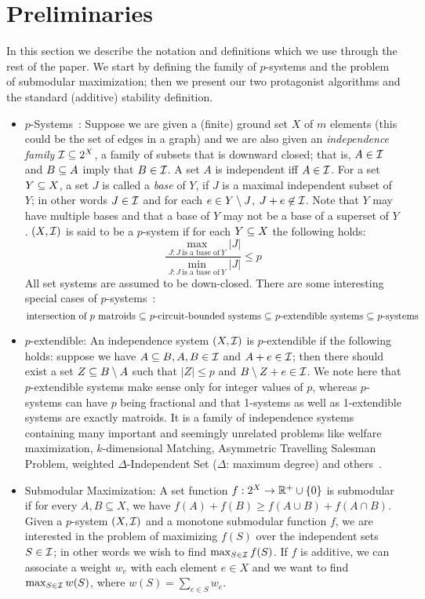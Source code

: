\section{Preliminaries}\label{sec:preliminaries}
In this section we describe the notation and definitions which we use through the rest of the paper. We start by defining the family of $p$-systems and the problem of submodular maximization; then we present our two protagonist algorithms and the standard (additive) stability definition.

\begin{itemize}
\item
$p$-Systems~\cite{korte1978analysis,lee2009submodular}: Suppose we are given a (finite) ground set $X$ of $m$ elements (this could be the set of edges in a graph) and we are also given an \textit{independence family} $\mathcal{I}\subseteq 2^X$, a family of subsets that is downward closed; that is, $A \in \mathcal{I}$ and $B\subseteq A$ imply that $B\in \mathcal{I}$. A set $A$ is independent iff $A\in \mathcal{I}$. For a set $Y\subseteq X$, a set $J$ is called a \textit{base} of $Y$, if $J$  is a maximal independent subset of $Y$; in other words $J\in \mathcal{I}$ and for each $e\in Y\setminus J$, $J+e\not\in \mathcal{I}$. Note that $Y$ may have multiple bases and that a base of $Y$ may not be a base of a superset of $Y$. $(X,\mathcal{I})$ is said to be a $p$-system if for each $Y\subseteq X$ the following holds:
\[ \dfrac{\max_{J: J\ \text{is a base of}\ Y} |J|}{\min_{J: J\ \text{is a base of}\ Y}|J|} \le p\]
 All set systems are assumed to be down-closed. There are some interesting special cases of $p$-systems~\cite{mestre2006greedy, calinescu2011maximizing}: 
\[
\text{intersection of $p$ matroids $\subseteq$ $p$-circuit-bounded systems $\subseteq$ $p$-extendible systems $\subseteq$ $p$-systems} 
\]
\item $p$-extendible: An independence system $(X,\mathcal{I})$ is $p$-extendible if the following holds: suppose we have $A\subseteq B, A,B \in \mathcal{I}$ and $A+e\in \mathcal{I}$; then there should exist a set $Z\subseteq B\setminus A$ such that $|Z|\le p$ and $B\setminus Z +e \in \mathcal{I}$. We note here that $p$-extendible systems make sense only for integer values of $p$, whereas $p$-systems can have $p$ being fractional and that 1-systems as well as 1-extendible systems are exactly matroids. It is a family of independence systems containing many important and seemingly unrelated problems like welfare maximization, $k$-dimensional Matching, Asymmetric Travelling Salesman Problem, weighted $\Delta$-Independent Set ($\Delta$: maximum degree) and others~\cite{mestre2006greedy}.

\item
Submodular Maximization: A set function $f : 2^X\rightarrow \mathbb{R}^+\cup \{0\}$ is submodular if for every $A, B \subseteq X$, we have $f(A) + f(B) \ge f(A \cup B) +
f(A\cap B)$. Given a $p$-system $(X,\mathcal{I})$ and a monotone submodular function $f$, we are interested in the problem of maximizing $f(S)$ over the
independent sets $S \in \mathcal{I}$; in other words we wish to find $\max_{S\in \mathcal{I}} f(S)$. If $f$ is additive, we can associate a weight $w_e$ with each element $e \in X$ and we want to find $\max_{S\in \mathcal{I}}w(S)$, where $w(S)=\sum_{e\in S}w_e$.


\end{itemize}
